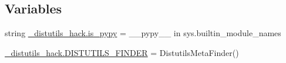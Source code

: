 \subsection*{Variables}
\begin{DoxyCompactItemize}
\item 
string \hyperlink{namespace__distutils__hack_a554235261bbfd9d8f098e1cb653eeaab}{\+\_\+distutils\+\_\+hack.\+is\+\_\+pypy} = \textquotesingle{}\+\_\+\+\_\+pypy\+\_\+\+\_\+\textquotesingle{} in sys.\+builtin\+\_\+module\+\_\+names
\item 
\hyperlink{namespace__distutils__hack_afca68fec42cc3c93d4ba68e039eb3749}{\+\_\+distutils\+\_\+hack.\+D\+I\+S\+T\+U\+T\+I\+L\+S\+\_\+\+F\+I\+N\+D\+ER} = Distutils\+Meta\+Finder()
\end{DoxyCompactItemize}
